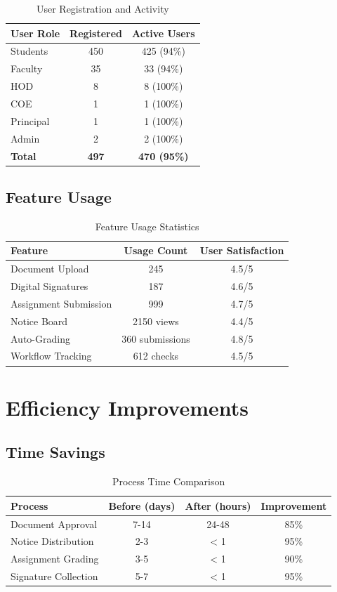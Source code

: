 \begin{table}[H]
\centering
\begin{tabular}{|l|c|c|}
\hline
\textbf{User Role} & \textbf{Registered} & \textbf{Active Users} \\
\hline
Students & 450 & 425 (94\%) \\
Faculty & 35 & 33 (94\%) \\
HOD & 8 & 8 (100\%) \\
COE & 1 & 1 (100\%) \\
Principal & 1 & 1 (100\%) \\
Admin & 2 & 2 (100\%) \\
\hline
\textbf{Total} & \textbf{497} & \textbf{470 (95\%)} \\
\hline
\end{tabular}
\caption{User Registration and Activity}
\end{table}

\subsection{Feature Usage}

\begin{table}[H]
\centering
\begin{tabular}{|l|c|c|}
\hline
\textbf{Feature} & \textbf{Usage Count} & \textbf{User Satisfaction} \\
\hline
Document Upload & 245 & 4.5/5 \\
Digital Signatures & 187 & 4.6/5 \\
Assignment Submission & 999 & 4.7/5 \\
Notice Board & 2150 views & 4.4/5 \\
Auto-Grading & 360 submissions & 4.8/5 \\
Workflow Tracking & 612 checks & 4.5/5 \\
\hline
\end{tabular}
\caption{Feature Usage Statistics}
\end{table}

\section{Efficiency Improvements}

\subsection{Time Savings}

\begin{table}[H]
\centering
\begin{tabular}{|l|c|c|c|}
\hline
\textbf{Process} & \textbf{Before (days)} & \textbf{After (hours)} & \textbf{Improvement} \\
\hline
Document Approval & 7-14 & 24-48 & 85\% \\
Notice Distribution & 2-3 & < 1 & 95\% \\
Assignment Grading & 3-5 & < 1 & 90\% \\
Signature Collection & 5-7 & < 1 & 95\% \\
\hline
\end{tabular}
\caption{Process Time Comparison}
\end{table}

